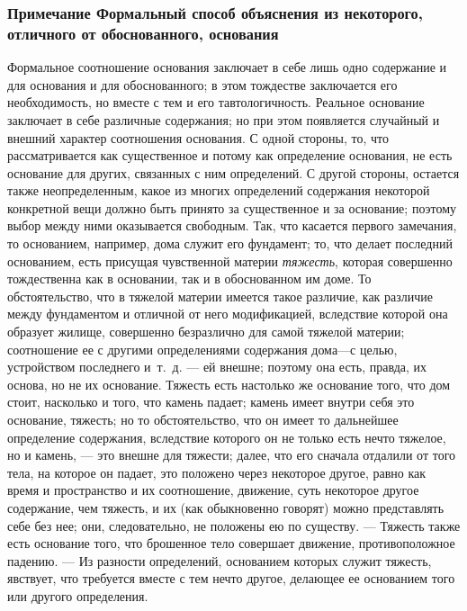 \subsubsection[Примечание Формальный способ объяснения из некоторого, отличного от обоснованного, основания]
{Примечание Формальный способ объяснения из некоторого, отличного от обоснованного, основания}

Формальное соотношение основания заключает в себе лишь одно содержание и для
основания и для обоснованного; в этом тождестве заключается его
необходимость, но вместе с тем и его тавтологичность. Реальное основание
заключает в себе различные содержания; но при этом появляется случайный и
внешний характер соотношения основания. С одной стороны, то, что
рассматривается как существенное и потому как определение основания, не
есть основание для других, связанных с ним определений. С другой стороны,
остается также неопределенным, какое из многих определений содержания
некоторой конкретной вещи должно быть принято за существенное и за
основание; поэтому выбор между ними оказывается свободным. Так, что
касается первого замечания, то основанием, например, дома служит его
фундамент; то, что делает последний основанием, есть присущая чувственной
материи {\em тяжесть}, которая совершенно тождественна
как в основании, так и в обоснованном им доме. То обстоятельство, что в
тяжелой материи имеется такое различие, как различие между фундаментом и
отличной от него модификацией, вследствие которой она образует жилище,
совершенно безразлично для самой тяжелой материи; соотношение ее с другими
определениями содержания дома—с целью, устройством последнего и~т.~д. — ей
внешне; поэтому она есть, правда, их основа, но не их основание. Тяжесть
есть настолько же основание того, что дом стоит, насколько и того, что
камень падает; камень имеет внутри себя это основание, тяжесть; но то
обстоятельство, что он имеет то дальнейшее определение содержания,
вследствие которого он не только есть нечто тяжелое, но и камень, — это
внешне для тяжести; далее, что его сначала отдалили от того тела, на
которое он падает, это положено через некоторое другое, равно как время и
пространство и их соотношение, движение, суть некоторое другое содержание,
чем тяжесть, и их (как обыкновенно говорят) можно представлять себе без
нее; они, следовательно, не положены ею по существу. — Тяжесть также есть
основание того, что брошенное тело совершает движение, противоположное
падению. — Из разности определений, основанием которых служит тяжесть,
явствует, что требуется вместе с тем нечто другое, делающее ее основанием
того или другого определения.

